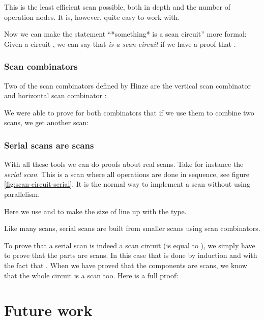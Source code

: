 This is the least efficient scan possible, both in depth and the
number of operation nodes.
It is, however, quite easy to work with.

Now we can make the statement ``*something* is a scan circuit'' more
formal:
Given a circuit  \AY{:}   , we can say that
 \emph{is a scan circuit} if we have a proof that  
 .

\subsubsection{Scan combinators}

Two of the scan combinators defined by Hinze are the vertical scan
combinator  and horizontal scan combinator :


We were able to prove for both combinators that if we use them to
combine two scans, we get another scan:


\subsubsection{Serial scans are scans}

With all these tools we can do proofs about real scans.
Take for instance the \emph{serial scan}.
This is a scan where all operations are done in sequence, see figure
\ref{fig:scan-circuit-serial}.
It is the normal way to implement a scan without using parallelism.

Here we use  and  to make the size of 
\AY{(} \AY{)}    line up with the
type.


Like many scans, serial scans are built from smaller scans using scan
combinators.

To prove that a serial scan is indeed a scan circuit (is equal to
 ), we simply have to prove that the parts are scans.
In this case that is done by induction and with the fact that
    .
When we have proved that the components are scans, we know that the
whole circuit is a scan too. Here is a full proof:


\section{Future work}\label{future-work}

